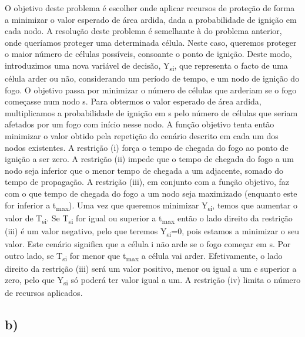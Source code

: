 \documentclass[11pt]{article} %
\begin{document}
O objetivo deste problema é escolher onde aplicar recursos de proteção de forma a minimizar o valor esperado de área ardida, dada a probabilidade de ignição em cada nodo. A resolução deste problema é semelhante à do problema anterior, onde queríamos proteger uma determinada célula. Neste caso, queremos proteger o maior número de células possíveis, consoante o ponto de ignição. Deste modo, introduzimos uma nova variável de decisão, Y\textsubscript{si}, que representa o facto de uma célula arder ou não, considerando um período de tempo, e um nodo de ignição do fogo. O objetivo passa por minimizar  o número de células que arderiam se o fogo começasse num nodo s.
Para obtermos o valor esperado de área ardida, multiplicamos a probabilidade de ignição em s pelo número de células que seriam afetados por um fogo com início nesse nodo. A função objetivo tenta então minimizar o valor obtido pela repetição do cenário descrito em cada um dos nodos existentes. A restrição (i) força o tempo de chegada do fogo ao ponto de ignição a ser zero. A restrição (ii) impede que o tempo de chegada do fogo a um nodo seja inferior que o menor tempo de chegada a um adjacente, somado do tempo de propagação. A restrição (iii), em conjunto com a função objetivo, faz com o que tempo de chegada do fogo a um nodo seja maximizado (enquanto este for inferior a t\textsubscript{max}). Uma vez que queremos minimizar Y\textsubscript{si}, temos que aumentar o valor de T\textsubscript{si}. Se  T\textsubscript{si} for igual ou superior a t\textsubscript{max} então o lado direito da restrição (iii) é um valor negativo, pelo que teremos Y\textsubscript{si}=0, pois estamos a minimizar o seu valor. Este cenário significa que a célula i não arde se o fogo começar em s. Por outro lado, se T\textsubscript{si} for menor que  t\textsubscript{max} a célula vai arder. Efetivamente, o lado direito da restrição (iii) será um valor positivo, menor ou igual a um e superior a zero, pelo que Y\textsubscript{si} só poderá ter valor igual a um. A restrição (iv) limita o número de recursos aplicados.
\subsection*{b)}
\end{document}
